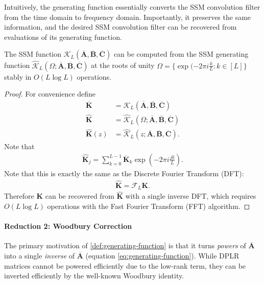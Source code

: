 Intuitively, the generating function essentially converts the SSM convolution filter from the time domain to frequency domain.
Importantly, it preserves the same information, and the desired SSM convolution filter can be recovered from evaluations of its generating function.
\begin{lemma}%
  The SSM function \( \mathcal{K}_L(\bm{\overline{A}}, \bm{\overline{B}}, \bm{\overline{C}}) \) can be computed from the SSM generating function \( \hat{\mathcal{K}}_L(\Omega; \bm{\overline{A}}, \bm{\overline{B}}, \bm{\overline{C}}) \)
  at the roots of unity \( \Omega = \{ \exp(-2\pi i \frac{k}{L} : k \in [L] \} \)
  stably in \( O(L \log L) \) operations.
\end{lemma}
\begin{proof}%
  For convenience define
  \begin{align*}
    \bm{\overline{K}} &= \mathcal{K}_L(\bm{\overline{A}}, \bm{\overline{B}}, \bm{\overline{C}}) \\
    \bm{\hat{K}} &=  \hat{\mathcal{K}}_L(\Omega; \bm{\overline{A}}, \bm{\overline{B}}, \bm{\overline{C}}) \\
    \bm{\hat{K}}(z) &=  \hat{\mathcal{K}}_L(z; \bm{\overline{A}}, \bm{\overline{B}}, \bm{\overline{C}})
    .
  \end{align*}
  Note that
  \begin{align*}
    \bm{\hat{K}}_j = \sum_{k=0}^{L-1} \bm{\overline{K}}_k \exp\left(-2\pi i \frac{jk}{L}\right).
  \end{align*}
  Note that this is exactly the same as the Discrete Fourier Transform (DFT):
  \begin{align*}
    \bm{\hat{K}} = \mathcal{F}_L \bm{K}.
  \end{align*}
  Therefore \( \bm{K} \) can be recovered from \( \bm{\hat{K}} \) with a single inverse DFT,
  which requires \( O(L \log L) \) operations with the Fast Fourier Transform (FFT) algorithm.
\end{proof}


\paragraph{Reduction 2: Woodbury Correction}

The primary motivation of \cref{def:generating-function} is that it turns \emph{powers} of \( \bm{\overline{A}} \) into a single \emph{inverse} of \( \bm{\overline{A}} \) (equation \eqref{eq:generating-function}).
While DPLR matrices cannot be powered efficiently due to the low-rank term, they can be inverted efficiently by the well-known Woodbury identity.


